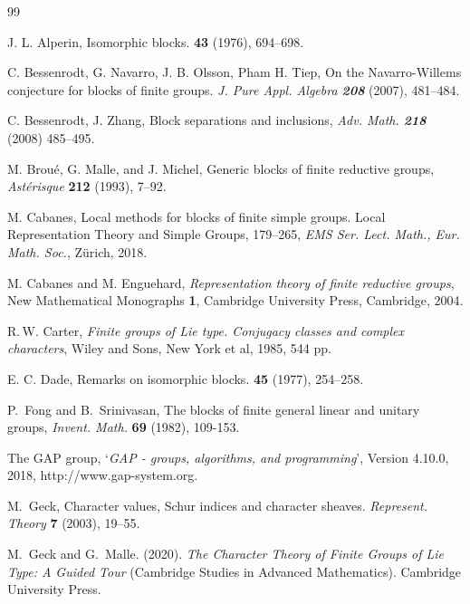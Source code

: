 \documentclass[12pt,leqno,a4paper]{amsart}
\theoremstyle{remark}
\begin{document}
  \begin{thebibliography}{99}



{\sc J. L. Alperin},
\newblock Isomorphic blocks.
 \textbf{43} (1976), 694--698.


{\sc C. Bessenrodt, G.  Navarro,  J. B. Olsson,
Pham H. Tiep}, On the Navarro-Willems conjecture for blocks of finite groups. 
\emph{J. Pure Appl. Algebra \bf208} (2007),   481--484. 


{\sc C. Bessenrodt, J. Zhang}, Block separations and inclusions, 
\emph{Adv. Math. \bf 218} (2008) 
485--495.


{\sc M. Brou\'{e}, G. Malle, and J. Michel}, Generic blocks of
finite reductive groups, \emph{Ast\'{e}risque} \textbf{212} (1993),
7--92.

{\sc M. Cabanes}, Local methods for blocks of finite simple groups.
Local Representation Theory and Simple Groups, 179--265, \emph{EMS
Ser. Lect. Math., Eur. Math. Soc.}, Z{\"u}rich, 2018.

{\sc M. Cabanes and M. Enguehard}, \emph{Representation theory of
finite reductive groups}, New Mathematical Monographs \textbf{1},
Cambridge University Press, Cambridge, 2004.

{\sc R.\,W. Carter}, \emph{Finite groups of Lie type. Conjugacy
classes and complex characters}, Wiley and Sons, New York et al,
1985, 544 pp.

{\sc E. C. Dade},
\newblock Remarks on isomorphic blocks.
 \textbf{45} (1977), 254--258.

{\sc P.~Fong and B.~Srinivasan}, The blocks of finite general linear and unitary groups, \emph{Invent. Math.} \textbf{69} (1982), 109-153.

{\sc The GAP group}, `{\it {\sf GAP} - groups, algorithms, and
programming}', Version 4.10.0, 
2018,
{\sf http://www.gap-system.org}.

{\sc M.~Geck}, Character values, Schur indices and character sheaves. 
\emph{Represent. Theory} \textbf{7} (2003), 19--55.

{\sc M.~Geck and G.~Malle}. (2020). \emph{The Character Theory of Finite Groups of Lie Type: A Guided Tour} (Cambridge Studies in Advanced Mathematics).  Cambridge University Press. 


\end{thebibliography}
\end{document}

